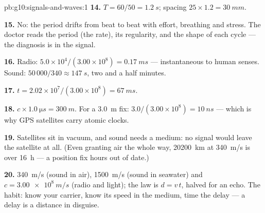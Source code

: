 \begin{solution}{pb:g10:signals-and-waves:1}
\textbf{14.} $T = 60/50 = \qty{1.2}{s}$; spacing
$25 \times 1.2 = \qty{30}{mm}$.

\textbf{15.} No: the period drifts from beat to beat with effort,
breathing and stress. The doctor reads the period (the rate), its
regularity, and the shape of each cycle --- the diagnosis is in the
signal.

\textbf{16.} Radio: $5.0\times10^{4}/(3.00\times10^{8}) =
\qty{0.17}{ms}$ --- instantaneous to human senses. Sound:
$50\,000/340 \approx \qty{147}{s}$, two and a half minutes.

\textbf{17.} $t = 2.02\times10^{7}/(3.00\times10^{8}) = \qty{67}{ms}$.

\textbf{18.} $c \times \qty{1.0}{\micro s} = \qty{300}{m}$. For a
\qty{3.0}{m} fix: $3.0/(3.00\times10^{8}) = \qty{10}{ns}$ --- which is
why GPS satellites carry atomic clocks.

\textbf{19.} Satellites sit in vacuum, and sound needs a medium: no
signal would leave the satellite at all. (Even granting air the whole
way, \qty{20200}{km} at \qty{340}{m/s} is over \qty{16}{h} --- a
position fix hours out of date.)

\textbf{20.} \qty{340}{m/s} (sound in air), \qty{1500}{m/s} (sound in
seawater) and $c = \qty{3.00e8}{m/s}$ (radio and light); the law is
$d = v\,t$, halved for an echo. The habit: know your carrier, know its
speed in the medium, time the delay --- a delay is a distance in
disguise.
\end{solution}
